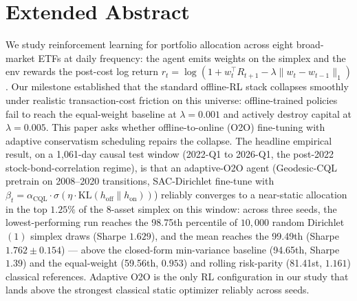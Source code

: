 
\section*{Extended Abstract}

We study reinforcement learning for portfolio allocation across eight
broad-market ETFs at daily frequency: the agent emits weights on the
simplex and the env rewards the post-cost log return $r_t = \log(1 +
w_t^\top R_{t+1} - \lambda \|w_t - w_{t-1}\|_1)$. Our milestone
established that the standard offline-RL stack collapses smoothly
under realistic transaction-cost friction on this universe:
offline-trained policies fail to reach the equal-weight baseline at
$\lambda{=}0.001$ and actively destroy capital at $\lambda{=}0.005$.
This paper asks whether offline-to-online (O2O) fine-tuning with
adaptive conservatism scheduling repairs the collapse. The headline
empirical result, on a 1{,}061-day causal test window (2022-Q1 to
2026-Q1, the post-2022 stock-bond-correlation regime), is that an
adaptive-O2O agent (Geodesic-CQL pretrain on 2008--2020 transitions,
SAC-Dirichlet fine-tune with $\beta_t = \alpha_{\mathrm{CQL}} \cdot
\sigma(\eta \cdot \mathrm{KL}(h_{\text{off}} \| h_{\text{on}}))$)
reliably converges to a near-static allocation in the top $1.25\%$ of
the 8-asset simplex on this window: across three seeds, the
lowest-performing run reaches the 98.75th percentile of $10{,}000$
random Dirichlet$(1)$ simplex draws (Sharpe $1.629$), and the mean
reaches the 99.49th (Sharpe $1.762 \pm 0.154$) --- above the
closed-form min-variance baseline (94.65th, Sharpe $1.39$) and the
equal-weight (59.56th, $0.953$) and rolling risk-parity (81.41st,
$1.161$) classical references. Adaptive O2O is the only RL
configuration in our study that lands above the strongest classical
static optimizer reliably across seeds.


